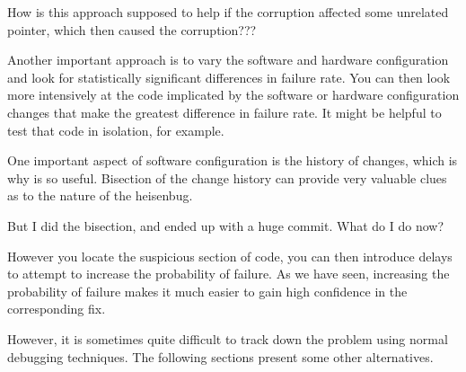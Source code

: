\QuickQuiz{}
	How is this approach supposed to help if the corruption affected some
	unrelated pointer, which then caused the corruption???
 \QuickQuizEnd

Another important approach is to
vary the software and hardware configuration and look for statistically
significant differences in failure rate.
You can then look more intensively at the code implicated by the
software or hardware configuration changes that make the greatest
difference in failure rate.
It might be helpful to test that code in isolation, for example.

One important aspect of software configuration is the history of
changes, which is why  is so useful.
Bisection of the change history can provide very valuable clues as
to the nature of the heisenbug.

\QuickQuiz{}
	But I did the bisection, and ended up with a huge commit.
	What do I do now?
 \QuickQuizEnd

However you locate the suspicious section of code, you can then introduce
delays to attempt to increase the probability of failure.
As we have seen, increasing the probability of failure makes it much
easier to gain high confidence in the corresponding fix.

However, it is sometimes quite difficult to track down the problem using
normal debugging techniques.
The following sections present some other alternatives.

